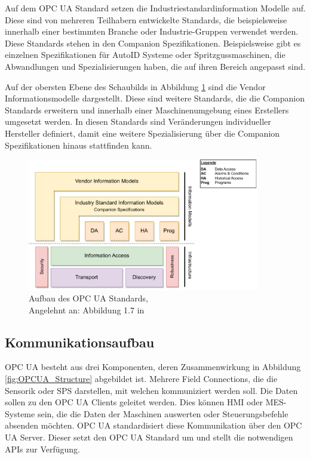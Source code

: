 \documentclass[a4paper, 12pt, oneside]{scrbook}
\begin{document}
		Auf dem OPC UA Standard setzen die Industriestandardinformation Modelle auf. Diese sind von mehreren Teilhabern entwickelte Standards, die beispielsweise innerhalb einer bestimmten Branche oder Industrie-Gruppen verwendet werden. Diese Standards stehen in den Companion Spezifikationen. Beispielsweise gibt es einzelnen Spezifikationen für AutoID Systeme oder Spritzgussmaschinen, die Abwandlungen und Spezialisierungen haben, die auf ihren Bereich angepasst sind. \cite{mahnke_opc_2009, rinke_was_2022}
		
		Auf der obersten Ebene des Schaubilds in Abbildung \ref{fig:OPCUA_Framework} sind die Vendor Informationsmodelle dargestellt. Diese sind weitere Standards, die die Companion Standards erweitern und innerhalb einer Maschinenumgebung eines Erstellers umgesetzt werden. In diesen Standards sind Veränderungen individueller Hersteller definiert, damit eine weitere Spezialisierung über die Companion Spezifikationen hinaus stattfinden kann. \cite{mahnke_opc_2009, rinke_was_2022}
		
		
		\begin{figure}[H]
			\centering
			\includegraphics[width=0.9\textwidth]{res/diagramms/companionSpezifikations.pdf}
			\caption{Aufbau des OPC UA Standards, \\ Angelehnt an: Abbildung 1.7 in \cite{mahnke_opc_2009}} %
			\label{fig:OPCUA_Framework}
		\end{figure}
	
		\subsection{Kommunikationsaufbau} 
		
		OPC UA besteht aus drei Komponenten, deren Zusammenwirkung in Abbildung \ref{fig:OPCUA_Structure} abgebildet ist. Mehrere Field Connections, die die Sensorik oder SPS darstellen, mit welchen kommuniziert werden soll. Die Daten sollen zu den OPC UA Clients geleitet werden. Dies können \ac{HMI} oder MES-Systeme sein, die die Daten der Maschinen auswerten oder Steuerungsbefehle absenden möchten. OPC UA standardisiert diese Kommunikation über den OPC UA Server. Dieser setzt den OPC UA Standard um und stellt die notwendigen APIs zur Verfügung. \cite{rinke_was_2022}
		
\end{document}
